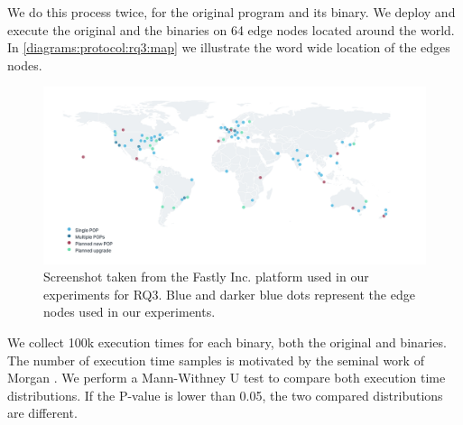 We do this process twice, for the original program and its binary. We deploy and execute the original and the binaries on 64 edge nodes located around the world. In \autoref{diagrams:protocol:rq3:map} we illustrate the word wide location of the edges nodes.


\begin{figure}[h]
    \centering
    \includegraphics[width=\linewidth]{diagrams/pops.png}
    \caption{Screenshot taken from the Fastly Inc. platform used in our experiments for RQ3. Blue and darker blue dots represent the edge nodes used in our experiments.}
    \label{diagrams:protocol:rq3:map}
\end{figure}



We collect 100k execution times for each binary, both the original and binaries. The number of execution time samples is motivated by the seminal work of Morgan \etal \cite{morgan2015web}. 
We perform a Mann-Withney U test \cite{mann1947} to compare both execution time distributions. 
If the P-value is lower than 0.05, the two compared distributions are different.
